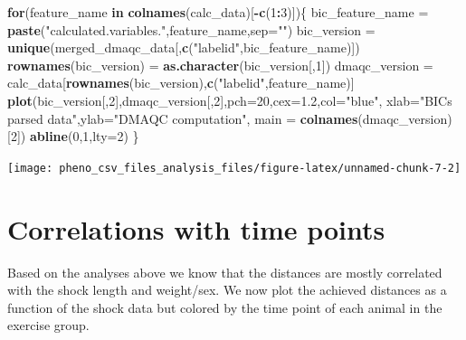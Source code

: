 \documentclass[]{article}
\newenvironment{Shaded}{\begin{snugshade}}{\end{snugshade}}
\newcommand{\KeywordTok}[1]{\textcolor[rgb]{0.13,0.29,0.53}{\textbf{#1}}}
\newcommand{\DataTypeTok}[1]{\textcolor[rgb]{0.13,0.29,0.53}{#1}}
\newcommand{\DecValTok}[1]{\textcolor[rgb]{0.00,0.00,0.81}{#1}}
\newcommand{\FloatTok}[1]{\textcolor[rgb]{0.00,0.00,0.81}{#1}}
\newcommand{\StringTok}[1]{\textcolor[rgb]{0.31,0.60,0.02}{#1}}
\newcommand{\ControlFlowTok}[1]{\textcolor[rgb]{0.13,0.29,0.53}{\textbf{#1}}}
\newcommand{\OperatorTok}[1]{\textcolor[rgb]{0.81,0.36,0.00}{\textbf{#1}}}
\newcommand{\NormalTok}[1]{#1}
\begin{document}
\begin{Shaded}
\begin{Highlighting}[]
\ControlFlowTok{for}\NormalTok{(feature_name }\ControlFlowTok{in} \KeywordTok{colnames}\NormalTok{(calc_data)[}\OperatorTok{-}\KeywordTok{c}\NormalTok{(}\DecValTok{1}\OperatorTok{:}\DecValTok{3}\NormalTok{)])\{}
\NormalTok{  bic_feature_name =}\StringTok{ }\KeywordTok{paste}\NormalTok{(}\StringTok{"calculated.variables."}\NormalTok{,feature_name,}\DataTypeTok{sep=}\StringTok{""}\NormalTok{)}
\NormalTok{  bic_version =}\StringTok{ }\KeywordTok{unique}\NormalTok{(merged_dmaqc_data[,}\KeywordTok{c}\NormalTok{(}\StringTok{"labelid"}\NormalTok{,bic_feature_name)])}
  \KeywordTok{rownames}\NormalTok{(bic_version) =}\StringTok{ }\KeywordTok{as.character}\NormalTok{(bic_version[,}\DecValTok{1}\NormalTok{])}
\NormalTok{  dmaqc_version =}\StringTok{ }\NormalTok{calc_data[}\KeywordTok{rownames}\NormalTok{(bic_version),}\KeywordTok{c}\NormalTok{(}\StringTok{"labelid"}\NormalTok{,feature_name)]}
  \KeywordTok{plot}\NormalTok{(bic_version[,}\DecValTok{2}\NormalTok{],dmaqc_version[,}\DecValTok{2}\NormalTok{],}\DataTypeTok{pch=}\DecValTok{20}\NormalTok{,}\DataTypeTok{cex=}\FloatTok{1.2}\NormalTok{,}\DataTypeTok{col=}\StringTok{"blue"}\NormalTok{,}
       \DataTypeTok{xlab=}\StringTok{"BICs parsed data"}\NormalTok{,}\DataTypeTok{ylab=}\StringTok{"DMAQC computation"}\NormalTok{,}
       \DataTypeTok{main =} \KeywordTok{colnames}\NormalTok{(dmaqc_version)[}\DecValTok{2}\NormalTok{])}
  \KeywordTok{abline}\NormalTok{(}\DecValTok{0}\NormalTok{,}\DecValTok{1}\NormalTok{,}\DataTypeTok{lty=}\DecValTok{2}\NormalTok{)}
\NormalTok{\}}
\end{Highlighting}
\end{Shaded}

\begin{center}\texttt{[image: pheno\_csv\_files\_analysis\_files/figure-latex/unnamed-chunk-7-2]} \end{center}

\section{Correlations with time
points}\label{correlations-with-time-points}

Based on the analyses above we know that the distances are mostly
correlated with the shock length and weight/sex. We now plot the
achieved distances as a function of the shock data but colored by the
time point of each animal in the exercise group.
\end{document}
